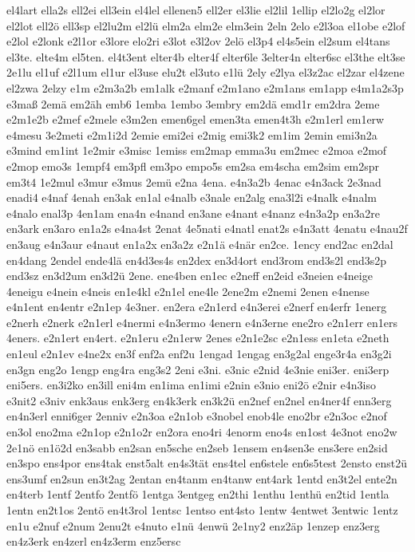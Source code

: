 {el4lart
ella2s
ell2ei
ell3ein
el4lel
ellenen5
ell2er
el3lie
el2lil
1ellip
el2lo2g
el2lor
el2lot
ell2ö
ell3sp
el2lu2m
el2lü
elm2a
elm2e
elm3ein
2eln
2elo
e2l3oa
el1obe
e2lof
e2lol
e2lonk
e2l1or
e3lore
elo2ri
e3lot
e3l2ov
2elö
el3p4
el4s5ein
el2sum
el4tans
el3te.
elte4m
el5ten.
el4t3ent
elter4b
elter4f
elter6le
3elter4n
elter6sc
el3the
elt3se
2e1lu
el1uf
e2l1um
el1ur
el3use
elu2t
el3uto
e1lü
2ely
e2lya
el3z2ac
el2zar
el4zene
el2zwa
2elzy
e1m
e2m3a2b
em1alk
e2manf
e2m1ano
e2m1ans
em1app
e4m1a2s3p
e3maß
2emä
em2äh
emb6
1emba
1embo
3embry
em2dä
emd1r
em2dra
2eme
e2m1e2b
e2mef
e2mele
e3m2en
emen6gel
emen3ta
emen4t3h
e2m1erl
em1erw
e4mesu
3e2meti
e2m1i2d
2emie
emi2ei
e2mig
emi3k2
em1im
2emin
emi3n2a
e3mind
em1int
1e2mir
e3misc
1emiss
em2map
emma3u
em2mec
e2moa
e2mof
e2mop
emo3s
1empf4
em3pfl
em3po
empo5s
em2sa
em4scha
em2sim
em2spr
em3t4
1e2mul
e3mur
e3mus
2emü
e2na
4ena.
e4n3a2b
4enac
e4n3ack
2e3nad
enadi4
e4naf
4enah
en3ak
en1al
e4nalb
e3nale
en2alg
ena3l2i
e4nalk
e4nalm
e4nalo
enal3p
4en1am
ena4n
e4nand
en3ane
e4nant
e4nanz
e4n3a2p
en3a2re
en3ark
en3aro
en1a2s
e4na4st
2enat
4e5nati
e4natl
enat2s
e4n3att
4enatu
e4nau2f
en3aug
e4n3aur
e4naut
en1a2x
en3a2z
e2n1ä
e4när
en2ce.
1ency
end2ac
en2dal
en4dang
2endel
ende4lä
en4d3es4s
en2dex
en3d4ort
end3rom
end3s2l
end3s2p
end3sz
en3d2um
en3d2ü
2ene.
ene4ben
en1ec
e2neff
en2eid
e3neien
e4neige
4eneigu
e4nein
e4neis
en1e4kl
e2n1el
ene4le
2ene2m
e2nemi
2enen
e4nense
e4n1ent
en4entr
e2n1ep
4e3ner.
en2era
e2n1erd
e4n3erei
e2nerf
en4erfr
1energ
e2nerh
e2nerk
e2n1erl
e4nermi
e4n3ermo
4enern
e4n3erne
ene2ro
e2n1err
en1ers
4eners.
e2n1ert
en4ert.
e2n1eru
e2n1erw
2enes
e2n1e2sc
e2n1ess
en1eta
e2neth
en1eul
e2n1ev
e4ne2x
en3f
enf2a
enf2u
1engad
1engag
en3g2al
enge3r4a
en3g2i
en3gn
eng2o
1engp
eng4ra
eng3s2
2eni
e3ni.
e3nic
e2nid
4e3nie
eni3er.
eni3erp
eni5ers.
en3i2ko
en3ill
eni4m
en1ima
en1imi
e2nin
e3nio
eni2ö
e2nir
e4n3iso
e3nit2
e3niv
enk3aus
enk3erg
en4k3erk
en3k2ü
en2nef
en2nel
en4ner4f
enn3erg
en4n3erl
enni6ger
2enniv
e2n3oa
e2n1ob
e3nobel
enob4le
eno2br
e2n3oc
e2nof
en3ol
eno2ma
e2n1op
e2n1o2r
en2ora
eno4ri
4enorm
eno4s
en1ost
4e3not
eno2w
2e1nö
en1ö2d
en3sabb
en2san
en5sche
en2seb
1ensem
en4sen3e
ens3ere
en2sid
en3spo
ens4por
ens4tak
enst5alt
en4s3tät
ens4tel
en6stele
en6s5test
2ensto
enst2ü
ens3umf
en2sun
en3t2ag
2entan
en4tanm
en4tanw
ent4ark
1entd
en3t2el
ente2n
en4terb
1entf
2entfo
2entfö
1entga
3entgeg
en2thi
1enthu
1enthü
en2tid
1entla
1entn
en2t1os
2entö
en4t3rol
1entsc
1entso
ent4sto
1entw
4entwet
3entwic
1entz
en1u
e2nuf
e2num
2enu2t
e4nuto
e1nü
4enwü
2e1ny2
enz2äp
1enzep
enz3erg
en4z3erk
en4zerl
en4z3erm
enz5ersc
}
